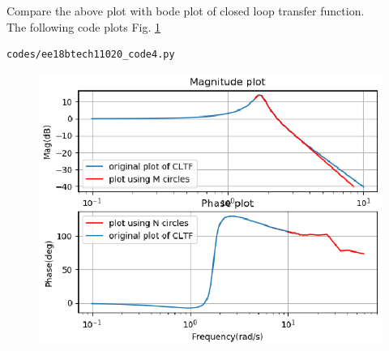 \item
Compare the above plot with bode plot of closed loop transfer function.\\
\solution
The following code plots Fig. \ref{fig:ee18btech11020_fig3}
\begin{lstlisting}
codes/ee18btech11020_code4.py
\end{lstlisting}

\begin{figure}[!h]
  \includegraphics[width=\columnwidth]{./figs/ee18btech11020/Figure_3.eps}
 \caption{}
  \label{fig:ee18btech11020_fig3}
\end{figure}














